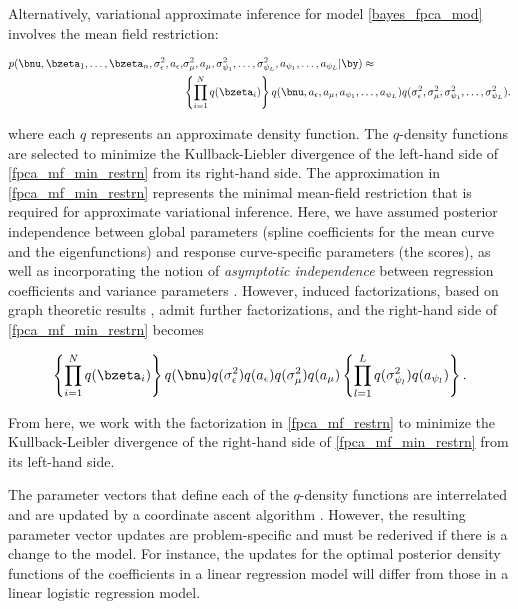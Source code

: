 \documentclass[12pt]{article}
\def\sigsqeps{\sigma^2_{\epsilon}}
\def\aeps{a_{\epsilon}}
\def\sigsqmu{\sigma^2_{\mu}}
\def\amu{a_{\mu}}
\newcommand\sigsqpsi[1]{\sigma^2_{\psi_{#1}}}
\newcommand\apsi[1]{a_{\psi_{#1}}}
\theoremstyle{plain}
\theoremstyle{definition}
\theoremstyle{remark}
\begin{document}
Alternatively, variational approximate inference for model \eqref{bayes_fpca_mod} involves
the mean field restriction:

\begin{align}
\begin{split}
	p (
		\bnu, \bzeta_1, \dots, \bzeta_n, \sigsqeps, \aeps, &\sigsqmu, \amu,
		\sigsqpsi{1}, \dots, \sigsqpsi{L}, \apsi{1}, \dots, \apsi{L} | \by
	) \approx \\
		&\left\{ \prod_{i=1}^N q (\bzeta_i) \right\} q (\bnu, \aeps, \amu, \apsi{1}, \dots, \apsi{L})
		q(\sigsqeps, \sigsqmu, \sigsqpsi{1}, \dots, \sigsqpsi{L}).
\end{split}
\label{fpca_mf_min_restrn}
\end{align}

\noindent where each $q$ represents an approximate density function. The $q$-density functions are
selected to minimize the Kullback-Liebler divergence of the left-hand side of \eqref{fpca_mf_min_restrn}
from its right-hand side.
The approximation in \eqref{fpca_mf_min_restrn} represents the minimal mean-field restriction that is
required for approximate variational inference. Here, we have assumed posterior independence between
global parameters (spline coefficients for the mean curve and the eigenfunctions)
and response curve-specific parameters (the scores), as well as incorporating the notion of
\emph{asymptotic independence} between regression coefficients and variance parameters
\cite[Section~3.1]{menictas13}.
However, induced factorizations, based on graph theoretic
results \cite[Section~10.2.5]{bishop06}, admit further factorizations, and the right-hand side of
\eqref{fpca_mf_min_restrn} becomes

\begin{equation}
	\left\{ \prod_{i=1}^N q (\bzeta_i) \right\} q (\bnu) q(\sigsqeps) q(\aeps)
	q(\sigsqmu) q (\amu) \left\{ \prod_{l=1}^L q(\sigsqpsi{l}) q(\apsi{l}) \right\}.
\label{fpca_mf_restrn}
\end{equation}

\noindent From here, we work with the factorization in \eqref{fpca_mf_restrn} to minimize the Kullback-Leibler
divergence  of the right-hand side of \eqref{fpca_mf_min_restrn} from its left-hand side.

The parameter vectors that define each of the $q$-density
functions are interrelated and are updated
by a coordinate ascent algorithm \cite[Algorithm~1]{ormerod10}. However, the resulting parameter vector updates
are problem-specific and must be rederived if there is a change to the model. For instance, the updates for the
optimal posterior density functions of the coefficients in a linear regression model will differ from those in a
linear logistic regression model.
\end{document}
